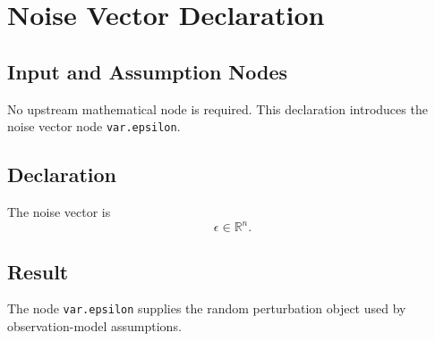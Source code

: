 \section{Noise Vector Declaration}
\label{def:noise-vector}

\subsection{Input and Assumption Nodes}
No upstream mathematical node is required. This declaration introduces the noise vector node \texttt{var.epsilon}.

\subsection{Declaration}
The noise vector is
\[
  \epsilon \in \mathbb{R}^{n}.
\]

\subsection{Result}
The node \texttt{var.epsilon} supplies the random perturbation object used by observation-model assumptions.
